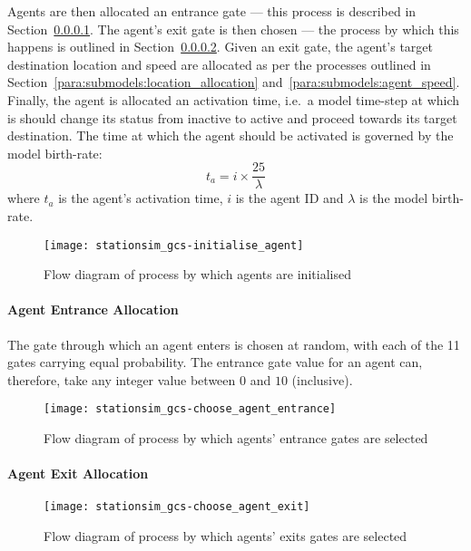 Agents are then allocated an entrance gate --- this process is described in
Section~\ref{para:submodels:agent_entrance}.
The agent's exit gate is then chosen --- the process by which this happens is
outlined in Section~\ref{para:submodels:agent_exit}.
Given an exit gate, the agent's target destination location and speed are
allocated as per the processes outlined in
Section~\ref{para:submodels:location_allocation}
and~\ref{para:submodels:agent_speed}.
Finally, the agent is allocated an activation time, i.e.\ a model time-step at
which is should change its status from inactive to active and proceed towards
its target destination.
The time at which the agent should be activated is governed by the model
birth-rate:
\begin{equation}
    t_{a} = i \times \frac{25}{\lambda}
\end{equation}
where $t_{a}$ is the agent's activation time, $i$ is the agent ID and $\lambda$
is the model birth-rate.

\begin{figure}[h]
    \centering
    \texttt{[image: stationsim\_gcs-initialise\_agent]}
    \caption{Flow diagram of process by which agents are
    initialised}\label{fig:flow:agent_initialisation}
\end{figure}

\paragraph{Agent Entrance Allocation}\label{para:submodels:agent_entrance}

The gate through which an agent enters is chosen at random, with each of the 11
gates carrying equal probability.
The entrance gate value for an agent can, therefore, take any integer value
between $0$ and $10$ (inclusive).

\begin{figure}[h]
    \centering
    \texttt{[image: stationsim\_gcs-choose\_agent\_entrance]}
    \caption{Flow diagram of process by which agents' entrance gates are
    selected}\label{fig:flow:agent_entrance}
\end{figure}

\paragraph{Agent Exit Allocation}\label{para:submodels:agent_exit}

\begin{figure}[h]
    \centering
    \texttt{[image: stationsim\_gcs-choose\_agent\_exit]}
    \caption{Flow diagram of process by which agents' exits gates are
    selected}\label{fig:flow:agent_exit}
\end{figure}

